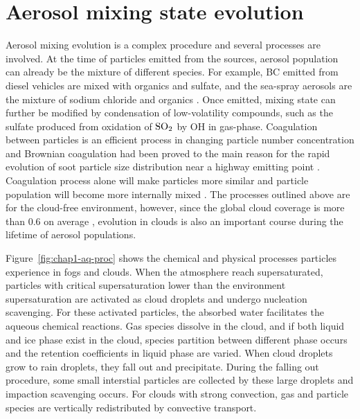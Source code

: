 \documentclass[edeposit,fullpage]{uiucthesis2009}
\begin{document}
\section{Aerosol mixing state evolution}  
Aerosol mixing evolution is a complex procedure and several processes are involved. At the time of particles emitted from the sources, aerosol population can already be the mixture of different species. For example, BC emitted from diesel vehicles are mixed with organics and sulfate, and the sea-spray aerosols are the mixture of sodium chloride and organics \citep{cheung2010emissions, kirpes2018secondary}. Once emitted, mixing state can further be modified by condensation of low-volatility compounds, such as the sulfate produced from oxidation of $\rm SO_2$ by OH in gas-phase. %
Coagulation between particles is an efficient process in changing particle number concentration and Brownian coagulation had been proved to the main reason for the 
rapid evolution of soot particle size distribution near a highway emitting point \citep{jacobson2004evolution}. Coagulation process alone will make particles more similar and particle population will become more internally mixed \citep{Riemer2013a}. The processes outlined above are for the cloud-free environment, however, since the global cloud coverage is more than 0.6 on average \citep{stubenrauch2013assessment}, evolution in clouds is also an important course during the lifetime of aerosol populations.

Figure~\ref{fig:chap1-aq-proc} shows the chemical and physical processes particles experience in fogs and clouds. When the atmosphere reach supersaturated, particles with critical supersaturation lower than the environment supersaturation are activated as cloud droplets and undergo nucleation scavenging. For these activated particles, the absorbed water facilitates the aqueous chemical reactions. Gas species dissolve in the cloud, and if both liquid and ice phase exist in the cloud, species partition between different phase occurs and the retention coefficients in liquid phase are varied. When cloud droplets grow to rain droplets, they fall out and precipitate. During the falling out procedure, some small interstial particles are collected by these large droplets and impaction scavenging occurs. For clouds with strong convection, gas and particle species are vertically redistributed by convective transport. 
\end{document}
